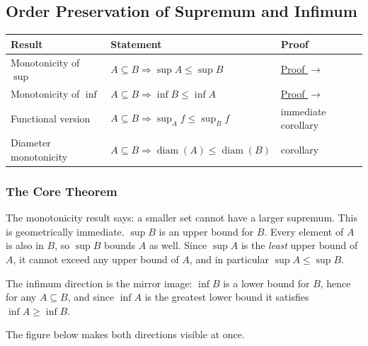 
\subsection{Order Preservation of Supremum and Infimum}
\label{sec:bound-monotone}

\begin{tcolorbox}[colback=gray!6, colframe=gray!40, arc=2pt,
  left=6pt, right=6pt, top=4pt, bottom=4pt,
  title={\small\textbf{Monotonicity — Quick Reference}},
  fonttitle=\small\bfseries]
\renewcommand{\arraystretch}{1.4}
\begin{tabular}{@{}p{} p{} p{}@{}}
\textbf{Result} & \textbf{Statement} & \textbf{Proof} \\
\midrule
Monotonicity of $\sup$
  & $A \subseteq B \Rightarrow \sup A \le \sup B$
  & \hyperref[prf:monotonicity-of-supremum]{Proof $\to$} \\
Monotonicity of $\inf$
  & $A \subseteq B \Rightarrow \inf B \le \inf A$
  & \hyperref[prf:monotonicity-of-infimum]{Proof $\to$} \\
Functional version
  & $A \subseteq B \Rightarrow \sup_A f \le \sup_B f$
  & immediate corollary \\
Diameter monotonicity
  & $A \subseteq B \Rightarrow \operatorname{diam}(A) \le \operatorname{diam}(B)$
  & corollary \\
\end{tabular}
\end{tcolorbox}

\subsubsection{The Core Theorem}

\begin{remark*}
The monotonicity result says: a smaller set cannot have a larger supremum.
This is geometrically immediate.
$\sup B$ is an upper bound for $B$.
Every element of $A$ is also in $B$, so $\sup B$ bounds $A$ as well.
Since $\sup A$ is the \emph{least} upper bound of $A$, it cannot exceed any
upper bound of $A$, and in particular $\sup A \le \sup B$.

The infimum direction is the mirror image: $\inf B$ is a lower bound for $B$,
hence for any $A \subseteq B$, and since $\inf A$ is the greatest lower bound
it satisfies $\inf A \ge \inf B$.

The figure below makes both directions visible at once.
\end{remark*}

